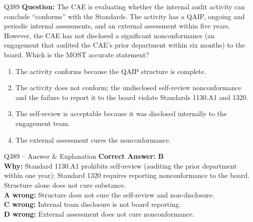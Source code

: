 \documentclass[aspectratio=169,10pt]{beamer}
\begin{document}
	\begin{frame}[t]{Q389}
		\small
		\textbf{Question:} The CAE is evaluating whether the internal audit activity can conclude ``conforms'' with the Standards. The activity has a QAIP, ongoing and periodic internal assessments, and an external assessment within five years. However, the CAE has not disclosed a significant nonconformance (an engagement that audited the CAE's prior department within six months) to the board. Which is the MOST accurate statement?
		\begin{enumerate}[label=\Alph*.,itemsep=1pt,topsep=2pt]
			\item The activity conforms because the QAIP structure is complete.
			\item The activity does not conform; the undisclosed self-review nonconformance and the failure to report it to the board violate Standards 1130.A1 and 1320.
			\item The self-review is acceptable because it was disclosed internally to the engagement team.
			\item The external assessment cures the nonconformance.
		\end{enumerate}
	\end{frame}
	
	\begin{frame}[t]{Q389 -- Answer \& Explanation}
		\small
		\textbf{Correct Answer: B} \\[4pt]
		\textbf{Why:} Standard 1130.A1 prohibits self-review (auditing the prior department within one year); Standard 1320 requires reporting nonconformance to the board. Structure alone does not cure substance. \\[4pt]
		\textbf{A wrong:} Structure does not cure the self-review and non-disclosure. \\[2pt]
		\textbf{C wrong:} Internal team disclosure is not board reporting. \\[2pt]
		\textbf{D wrong:} External assessment does not cure nonconformance.
	\end{frame}
	
\end{document}
